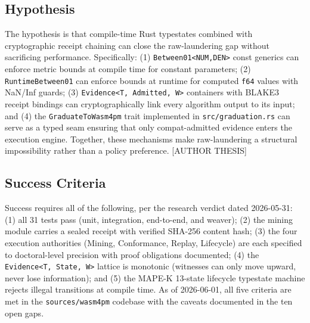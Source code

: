 \subsection{Hypothesis}
\label{sec:sources-wasm4pm-rq-hypothesis}

The hypothesis is that compile-time Rust typestates combined with cryptographic receipt chaining
can close the raw-laundering gap without sacrificing performance. Specifically: (1)
\texttt{Between01<NUM,DEN>} const generics can enforce metric bounds at compile time for constant
parameters; (2) \texttt{RuntimeBetween01} can enforce bounds at runtime for computed \texttt{f64}
values with NaN/Inf guards; (3) \texttt{Evidence<T,~Admitted,~W>} containers with BLAKE3 receipt
bindings can cryptographically link every algorithm output to its input; and (4) the
\texttt{GraduateToWasm4pm} trait implemented in \texttt{src/graduation.rs} can serve as a typed
seam ensuring that only compat-admitted evidence enters the execution engine. Together, these
mechanisms make raw-laundering a structural impossibility rather than a policy preference.
[AUTHOR THESIS]

\subsection{Success Criteria}
\label{sec:sources-wasm4pm-rq-success}

Success requires all of the following, per the research verdict dated 2026-05-31: (1) all 31
tests pass (unit, integration, end-to-end, and weaver); (2) the mining module carries a sealed
receipt with verified SHA-256 content hash; (3) the four execution authorities (Mining,
Conformance, Replay, Lifecycle) are each specified to doctoral-level precision with proof
obligations documented; (4) the \texttt{Evidence<T,~State,~W>} lattice is monotonic (witnesses
can only move upward, never lose information); and (5) the MAPE-K 13-state lifecycle typestate
machine rejects illegal transitions at compile time. As of 2026-06-01, all five criteria are met
in the \texttt{sources/wasm4pm} codebase with the caveats documented in the ten open gaps.
